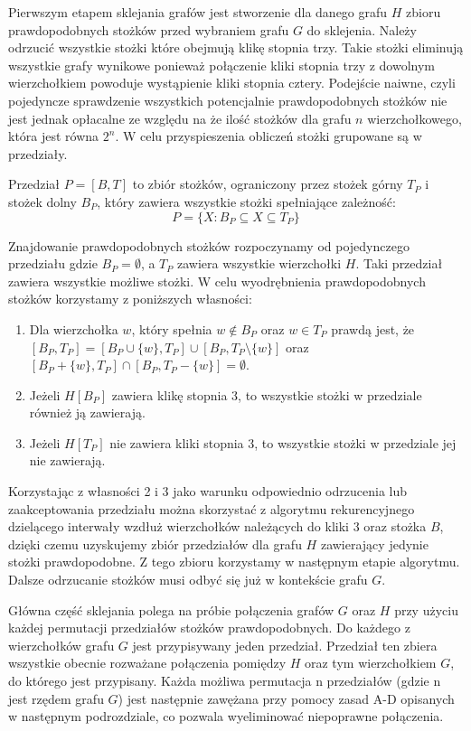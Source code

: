 Pierwszym etapem sklejania grafów jest stworzenie dla danego grafu $H$ zbioru prawdopodobnych stożków przed wybraniem grafu $G$ do sklejenia. Należy odrzucić wszystkie stożki które obejmują klikę stopnia trzy. Takie stożki eliminują wszystkie grafy wynikowe ponieważ połączenie kliki stopnia trzy z dowolnym wierzchołkiem powoduje wystąpienie kliki stopnia cztery. Podejście naiwne, czyli pojedyncze sprawdzenie wszystkich potencjalnie prawdopodobnych stożków nie jest jednak opłacalne ze względu na że ilość stożków dla grafu $n$ wierzchołkowego, która jest równa $2^n$. W celu przyspieszenia obliczeń stożki grupowane są w przedziały. 

\begin{definition}
Przedział $P = [B, T]$ to zbiór stożków, ograniczony przez stożek górny $T_P$ i stożek dolny $B_P$, który zawiera wszystkie stożki spełniające zależność:  $$P=\{X: B_P \subseteq X \subseteq T_P\}$$ 
\end{definition}


Znajdowanie prawdopodobnych stożków rozpoczynamy od pojedynczego przedziału gdzie $B_P = \emptyset$, a $T_P$ zawiera wszystkie wierzchołki $H$. Taki przedział zawiera wszystkie możliwe stożki. W celu wyodrębnienia prawdopodobnych stożków korzystamy z poniższych własności:
\begin{enumerate}
\item Dla wierzchołka $w$, który spełnia $w \notin B_P$ oraz $w\in T_P$ prawdą jest, że $[B_P, T_P] = [B_P \cup \{ w\}, T_P] \cup [B_P , T_P \setminus \{ w\}]$ oraz $[B_P +\{ w\}, T_P] \cap [B_P , T_P - \{ w\}] = \emptyset$. 

\item Jeżeli $H[B_P]$ zawiera klikę stopnia 3, to wszystkie stożki w przedziale również ją zawierają. 

\item Jeżeli $H[T_P]$ nie zawiera kliki stopnia 3, to wszystkie stożki w przedziale jej nie zawierają.
\end{enumerate}

Korzystając z własności 2 i 3 jako warunku odpowiednio odrzucenia lub zaakceptowania przedziału można skorzystać z algorytmu rekurencyjnego dzielącego interwały wzdłuż wierzchołków należących do kliki 3 oraz stożka $B$, dzięki czemu uzyskujemy zbiór przedziałów dla grafu $H$ zawierający jedynie stożki prawdopodobne. Z tego zbioru korzystamy w następnym etapie algorytmu.
Dalsze odrzucanie stożków musi odbyć się już w kontekście grafu $G$.

Główna część sklejania polega na próbie połączenia grafów $G$ oraz $H$ przy użyciu każdej permutacji przedziałów stożków prawdopodobnych. Do każdego z wierzchołków grafu $G$ jest przypisywany jeden przedział. Przedział ten zbiera wszystkie obecnie rozważane połączenia pomiędzy $H$ oraz tym wierzchołkiem $G$, do którego jest przypisany. Każda możliwa permutacja n przedziałów (gdzie n jest rzędem grafu $G$) jest następnie zawężana przy pomocy zasad A-D opisanych w następnym podrozdziale, co pozwala wyeliminować niepoprawne połączenia. 

